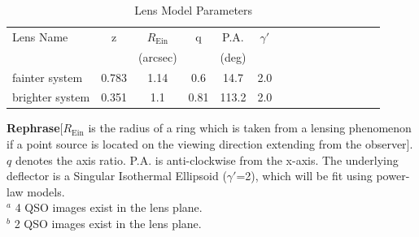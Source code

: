 \documentclass[a4paper,11pt]{article}
\begin{document}
\begin{table}\footnotesize
\begin{center}
\caption{Lens Model Parameters}
\begin{tabular}{lcccccccccccccc|}
\hline \hline
Lens Name & z & $R_\textrm{Ein}$ & q & P.A. & $\gamma'$\\
& & (arcsec) & & (deg) \\
\hline
fainter system & 0.783 & 1.14   &   0.6  &   14.7  &  2.0 \\
brighter system & 0.351 &  1.1    &   0.81  &   113.2  &  2.0 \\
\hline
\hline
\end{tabular}
\begin{tablenotes}
\item 
\textbf{Rephrase}[$R_\textrm{Ein}$ is the radius of a ring which is taken from a lensing phenomenon if a point source is located on the viewing direction extending from the observer]. $q$ denotes the axis ratio. P.A. is anti-clockwise from the x-axis. The underlying deflector is a Singular Isothermal Ellipsoid ($\gamma'$=2), which will be fit using power-law models.\\
$^a$ 4 QSO images exist in the lens plane. \\
$^b$ 2 QSO images exist in the lens plane. \\
\label{tab:lenspars}
\end{tablenotes}
\end{center}
\end{table}
\end{document}
